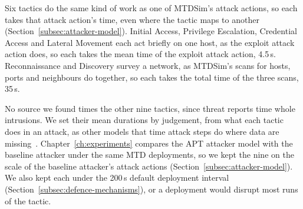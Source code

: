 \documentclass{cshonours}
\begin{document}
Six tactics do the same kind of work as one of MTDSim's attack actions, so
each takes that attack action's time, even where the tactic maps to another
(Section~\ref{subsec:attacker-model}). Initial Access, Privilege Escalation,
Credential Access and Lateral Movement each act briefly on one host, as the
exploit attack action does, so each takes the mean time of the exploit attack
action, 4.5\,s. Reconnaissance and Discovery survey a network, as MTDSim's
scans for hosts, ports and neighbours do together, so each takes the total
time of the three scans, 35\,s.

No source we found times the other nine tactics, since threat reports time whole
intrusions. We set their mean durations by judgement, from what each tactic
does in an attack, as other models that time attack steps do where data are
missing~\citep{mcqueen2006, bland2020}.
Chapter~\ref{ch:experiments} compares the APT attacker model with the baseline
attacker under the same MTD deployments, so we kept the nine on the scale of
the baseline attacker's attack actions (Section~\ref{subsec:attacker-model}).
We also kept each under the 200\,s default deployment interval
(Section~\ref{subsec:defence-mechanisms}), or a deployment would disrupt most
runs of the tactic.
\end{document}
